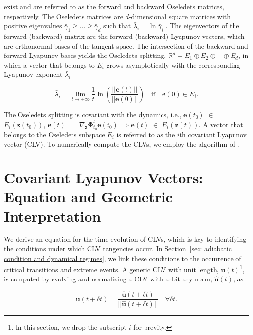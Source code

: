 \documentclass[aps,reprint,prx]{revtex4-2}
\begin{document}
exist and are referred to as the forward and backward Oseledets matrices, respectively. The Oseledets matrices are $d$-dimensional square matrices with positive eigenvalues $\bar\gamma_1 \geq ... \geq \bar\gamma_d$ such that $\bar\lambda_i = \ln\bar\gamma_i$ \cite{ginelliCovariantLyapunovVectors2013, kuptsovFastNumericalTest2012}.
The eigenvectors of the forward (backward) matrix are the forward (backward) Lyapunov vectors, which are orthonormal bases of the tangent space.
The intersection of the backward and forward Lyapunov bases \cite{ginelliCovariantLyapunovVectors2013} yields the Oseledets splitting,
$\mathbb{R}^d = E_1 \oplus E_2 \oplus \cdots \oplus E_d$, in which a vector that belongs to $E_i$ grows asymptotically with the corresponding Lyapunov exponent $\bar\lambda_i$

\begin{equation} \label{eq_8}
\bar\lambda_i = \lim_{t \to \pm \infty} \frac{1}{t} \ln \left(\frac{||\mathbf{e}(t)||}{||\mathbf{e}(0)||} \right) \quad \textrm{if} \quad \mathbf{e}(0) \in E_i.
\end{equation}

The Oseledets splitting is covariant with the dynamics, i.e.,
$\mathbf{e}(t_0)$ $\in$ $E_i(\mathbf{z}(t_0))$, $\mathbf{e}(t)$ $=$ $\nabla_{\mathbf{z}}\mathbf{\Phi}_{t_0}^{t}\mathbf{e}(t_0)$ $\Rightarrow \mathbf{e}(t)$ $\in$ $E_i(\mathbf{z}(t)).$
A vector that belongs to the Oseledets subspace $E_i$ is referred to as the $i$th covariant Lyapunov vector (CLV). To numerically compute the CLVs, we employ the algorithm of \cite{ginelliCharacterizingDynamicsCovariant2007, ginelliCovariantLyapunovVectors2013}.

\section{Covariant Lyapunov Vectors: Equation and Geometric Interpretation} \label{section:clv_equation}

We derive an equation for the time evolution of CLVs, which is key to identifying the conditions under which CLV tangencies occur. In Section~\ref{sec: adiabatic condition and dynamical regimes}, we link these conditions to the occurrence of critical transitions and extreme events. A generic CLV with unit length, $\mathbf{u}(t)$\footnote{In this section, we drop the subscript $i$ for brevity.}, is computed by evolving and normalizing a CLV with arbitrary norm, $\hat{\mathbf{u}}(t)$, as \cite{blanchardAnalyticalDescriptionOptimally2019}

\begin{equation} \label{eq_23}
{\mathbf{u}}(t+\delta t) = \frac{\hat{\mathbf{u}}(t+\delta t)}{||\hat{\mathbf{u}}(t + \delta t)||} \quad \forall \delta t.
\end{equation}
\end{document}
